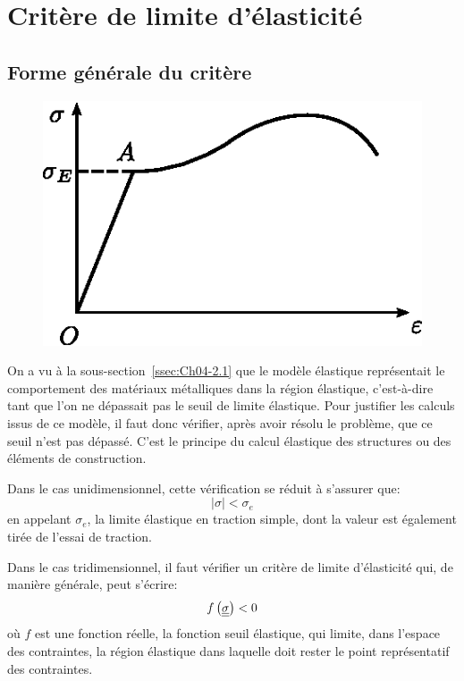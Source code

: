 \section{Critère de limite d'élasticité} \label{sec:Ch05-3}
\subsection{Forme générale du critère} \label{ssec:Ch05-3.1}
\begin{figure}
    \begin{center}
        \includegraphics[scale=1.1]{../images/T1_Ch05-01}
    \end{center}
\end{figure}
On a vu à la sous-section~\ref{ssec:Ch04-2.1} que le modèle élastique représentait le comportement des matériaux métalliques dans la région élastique, c'est-à-dire tant que l'on ne dépassait pas le seuil de limite élastique.
Pour justifier les calculs issus de ce modèle, il faut donc vérifier, après avoir résolu le problème, que ce seuil n'est pas dépassé. C'est le principe du calcul élastique des structures ou des éléments de construction.

Dans le cas unidimensionnel, cette vérification se réduit à s'assurer que: 
\begin{equation}
    |\sigma| < \sigma_e
    \label{eq:Ch05-057}
\end{equation}
en appelant $\sigma_e$, la limite élastique en traction simple, dont la valeur est également tirée de l'essai de traction. 

Dans le cas tridimensionnel, il faut vérifier un critère de limite d'élasticité qui, de manière générale, peut s'écrire: 
\begin{equation}
    f\left( \underline{\underline{\sigma}} \right) < 0
    \label{eq:Ch05-058}
\end{equation}
où $f$ est une fonction réelle, la fonction seuil élastique, qui limite, dans l'espace des contraintes, la région élastique dans laquelle doit rester le point représentatif des contraintes.

